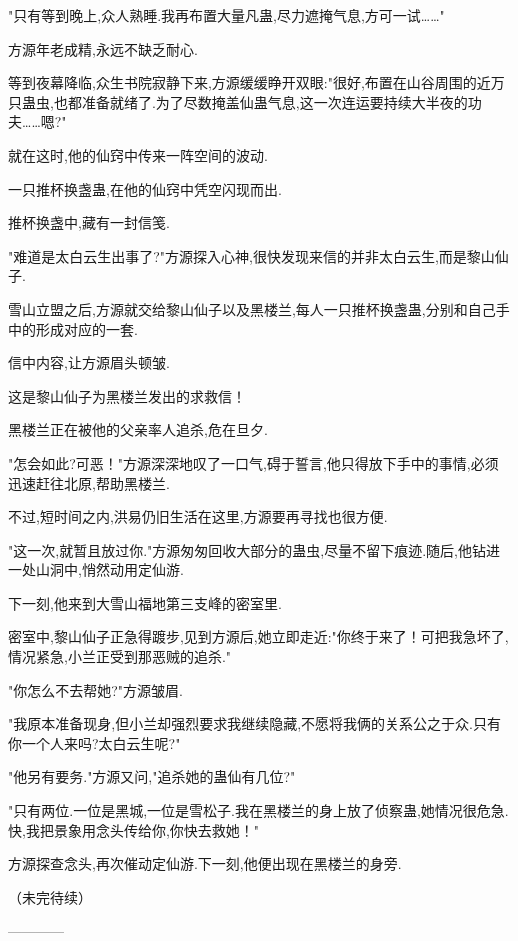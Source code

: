 \begin{this_body}
"只有等到晚上,众人熟睡.我再布置大量凡蛊,尽力遮掩气息,方可一试……"

方源年老成精,永远不缺乏耐心.

等到夜幕降临,众生书院寂静下来,方源缓缓睁开双眼:"很好,布置在山谷周围的近万只蛊虫,也都准备就绪了.为了尽数掩盖仙蛊气息,这一次连运要持续大半夜的功夫……嗯?"

就在这时,他的仙窍中传来一阵空间的波动.

一只推杯换盏蛊,在他的仙窍中凭空闪现而出.

推杯换盏中,藏有一封信笺.

"难道是太白云生出事了?"方源探入心神,很快发现来信的并非太白云生,而是黎山仙子.

雪山立盟之后,方源就交给黎山仙子以及黑楼兰,每人一只推杯换盏蛊,分别和自己手中的形成对应的一套.

信中内容,让方源眉头顿皱.

这是黎山仙子为黑楼兰发出的求救信！

黑楼兰正在被他的父亲率人追杀,危在旦夕.

"怎会如此?可恶！"方源深深地叹了一口气,碍于誓言,他只得放下手中的事情,必须迅速赶往北原,帮助黑楼兰.

不过,短时间之内,洪易仍旧生活在这里,方源要再寻找也很方便.

"这一次,就暂且放过你."方源匆匆回收大部分的蛊虫,尽量不留下痕迹.随后,他钻进一处山洞中,悄然动用定仙游.

下一刻,他来到大雪山福地第三支峰的密室里.

密室中,黎山仙子正急得踱步,见到方源后,她立即走近:"你终于来了！可把我急坏了,情况紧急,小兰正受到那恶贼的追杀."

"你怎么不去帮她?"方源皱眉.

"我原本准备现身,但小兰却强烈要求我继续隐藏,不愿将我俩的关系公之于众.只有你一个人来吗?太白云生呢?"

"他另有要务."方源又问,"追杀她的蛊仙有几位?"

"只有两位.一位是黑城,一位是雪松子.我在黑楼兰的身上放了侦察蛊,她情况很危急.快,我把景象用念头传给你,你快去救她！"

方源探查念头,再次催动定仙游.下一刻,他便出现在黑楼兰的身旁.

（未完待续）

------------

\end{this_body}

